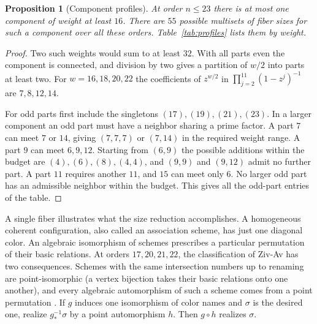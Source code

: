 \documentclass[11pt,reqno]{amsart}
\numberwithin{equation}{section}
\newtheorem{proposition}[theorem]{Proposition}
\theoremstyle{definition}
\begin{document}
\begin{proposition}[Component profiles]\label{prop:hand-shapes}
At order $n\le23$ there is at most one component of weight at least $16$. There are $55$ possible multisets of fiber sizes for such a component over all these orders. Table~\ref{tab:profiles} lists them by weight.
\end{proposition}
\begin{proof}
Two such weights would sum to at least $32$. With all parts even the component is connected, and division by two gives a partition of $w/2$ into parts at least two. For $w=16,18,20,22$ the coefficients of $z^{w/2}$ in $\prod_{j=2}^{11}(1-z^j)^{-1}$ are $7,8,12,14$.

For odd parts first include the singletons $(17),(19),(21),(23)$. In a larger component an odd part must have a neighbor sharing a prime factor. A part $7$ can meet $7$ or $14$, giving $(7,7,7)$ or $(7,14)$ in the required weight range. A part $9$ can meet $6,9,12$. Starting from $(6,9)$ the possible additions within the budget are $(4),(6),(8),(4,4)$, and $(9,9)$ and $(9,12)$ admit no further part. A part $11$ requires another $11$, and $15$ can meet only $6$. No larger odd part has an admissible neighbor within the budget. This gives all the odd-part entries of the table.
\end{proof}

A single fiber illustrates what the size reduction accomplishes. A homogeneous coherent configuration, also called an association scheme, has just one diagonal color. An algebraic isomorphism of schemes prescribes a particular permutation of their basic relations. At orders $17,20,21,22$, the classification of Ziv-Av has two consequences. Schemes with the same intersection numbers up to renaming are point-isomorphic (a vertex bijection takes their basic relations onto one another), and every algebraic automorphism of such a scheme comes from a point permutation \cite[Tables~2--3 and \S4.2]{ZivAv}. If $g$ induces one isomorphism of color names and $\sigma$ is the desired one, realize $g_*^{-1}\sigma$ by a point automorphism $h$. Then $g\circ h$ realizes $\sigma$.
\end{document}
